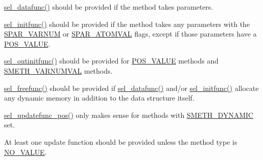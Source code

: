 \begin{DoxyItemize}
\item \hyperlink{include_2selmethod_8h_a5acbf2d7bead71c4d96f9e69b267df56}{sel\-\_\-datafunc()} should be provided if the method takes parameters.
\item \hyperlink{include_2selmethod_8h_a112e5ec6891c5963a59384cf41f0cc89}{sel\-\_\-initfunc()} should be provided if the method takes any parameters with the \hyperlink{share_2template_2gromacs_2selparam_8h_a400330277d7e17cdfef1610cc37838ea}{\-S\-P\-A\-R\-\_\-\-V\-A\-R\-N\-U\-M} or \hyperlink{share_2template_2gromacs_2selparam_8h_ababaf52ada40922bb660a4949e1e52f0}{\-S\-P\-A\-R\-\_\-\-A\-T\-O\-M\-V\-A\-L} flags, except if those parameters have a \hyperlink{share_2template_2gromacs_2selvalue_8h_a70b42b87d434580bf1493591857b8beca31a47fbfbc85ad1472ce3d2a168fd1ec}{\-P\-O\-S\-\_\-\-V\-A\-L\-U\-E}.
\item \hyperlink{include_2selmethod_8h_a682279959b047d5bf8a540b00196332b}{sel\-\_\-outinitfunc()} should be provided for \hyperlink{share_2template_2gromacs_2selvalue_8h_a70b42b87d434580bf1493591857b8beca31a47fbfbc85ad1472ce3d2a168fd1ec}{\-P\-O\-S\-\_\-\-V\-A\-L\-U\-E} methods and \hyperlink{share_2template_2gromacs_2selmethod_8h_ae0aa6a1bbb99ba5f0f6228c4cd401e0a}{\-S\-M\-E\-T\-H\-\_\-\-V\-A\-R\-N\-U\-M\-V\-A\-L} methods.
\item \hyperlink{include_2selmethod_8h_a2e05a0b2274edfeab965c363f646735a}{sel\-\_\-freefunc()} should be provided if \hyperlink{include_2selmethod_8h_a5acbf2d7bead71c4d96f9e69b267df56}{sel\-\_\-datafunc()} and/or \hyperlink{include_2selmethod_8h_a112e5ec6891c5963a59384cf41f0cc89}{sel\-\_\-initfunc()} allocate any dynamic memory in addition to the data structure itself.
\item \hyperlink{include_2selmethod_8h_a47bfb381e8df48bddd7ca78abff224bf}{sel\-\_\-updatefunc\-\_\-pos()} only makes sense for methods with \hyperlink{share_2template_2gromacs_2selmethod_8h_af38b0eb2b4e305ae83ded06f9b12252e}{\-S\-M\-E\-T\-H\-\_\-\-D\-Y\-N\-A\-M\-I\-C} set.
\item \-At least one update function should be provided unless the method type is \hyperlink{share_2template_2gromacs_2selvalue_8h_a70b42b87d434580bf1493591857b8beca4d694119ce83b62d74ff06b5e017dca8}{\-N\-O\-\_\-\-V\-A\-L\-U\-E}.
\end{DoxyItemize}

